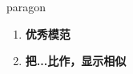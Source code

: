 
\begin{frame}
{\huge paragon}
\begin{center}
\begin{enumerate}\Large
  \item \textbf{优秀模范}
  \item \textbf{把...比作，显示相似}
\end{enumerate}
\end{center}
\end{frame}
